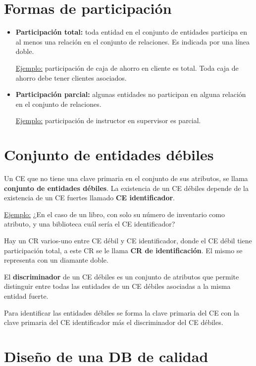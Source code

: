 \documentclass[12pt,a4paper]{report}
\begin{document}
	\section{Formas de participación}
		\begin{itemize}
			\item \textbf{Participación total:} toda entidad en el conjunto de entidades participa en al menos una relación en el conjunto de relaciones. Es indicada por una línea doble.
			\par \underline{Ejemplo:} participación de caja de ahorro en cliente es total. Toda caja de ahorro debe tener clientes asociados.
			\item \textbf{Participación parcial:} algunas entidades no participan en alguna relación en el conjunto de relaciones.
			\par \underline{Ejemplo:} participación de instructor en supervisor es parcial.
		\end{itemize}
		
	\section{Conjunto de entidades débiles}
		Un CE que no tiene una clave primaria en el conjunto de sus atributos, se llama \textbf{conjunto de entidades débiles}. La existencia de un CE débiles depende de la existencia de un CE fuertes llamado \textbf{CE identificador}. 		
		\vspace{5mm}
		\par \underline{Ejemplo:} ¿En el caso de un libro, con solo su número de inventario como atributo, y una biblioteca cuál sería el CE identificador?
		\vspace{2.5mm}
		\par Hay un CR varios-uno entre CE débil y CE identificador, donde el CE débil tiene participación total, a este CR se le llama \textbf{CR de identificación}. El mismo se representa con un diamante doble.
		\par El \textbf{discriminador} de un CE débiles es un conjunto de atributos que permite distinguir entre todas las entidades de un CE débiles asociadas a la misma entidad fuerte. 
		\par Para identificar las entidades débiles se forma la clave primaria del CE con la clave primaria del CE identificador más el discriminador del CE débiles.
		
	\section{Diseño de una DB de calidad}
\end{document}
